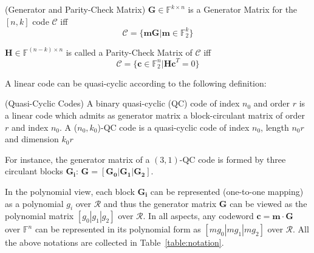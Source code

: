 \documentclass[runningheads]{llncs}
\begin{document}
\begin{definition}{(Generator and Parity-Check Matrix)}
$\mathbf{G}\in \mathbb{F}^{k\times n}$ is a Generator Matrix for the $[n,k]$ code $\mathcal{C}$ iff
\[
\mathcal{C}=\{\mathbf{mG}|\mathbf{m}\in \mathbb{F}_2^k\}
\]

$\mathbf{H}\in \mathbb{F}^{(n-k)\times n}$ is called a Parity-Check Matrix of $\mathcal{C}$ iff
\[
\mathcal{C}=\{\mathbf{c} \in \mathbb{F}_2^n |\mathbf{Hc}^T=0\}
\]
\end{definition}
%
A linear code can be quasi-cyclic according to the following definition:

\begin{definition}{(Quasi-Cyclic Codes)}
A binary quasi-cyclic (QC) code of index $n_0$ and order $r$ is a linear code which admits as generator matrix a block-circulant matrix of order $r$ and index $n_0$.
A ($n_0,k_0$)-QC code is a quasi-cyclic code of index $n_0$, length $n_0r$ and dimension $k_0r$
\end{definition}
%
For instance, the generator matrix of a $(3,1)$-QC code is formed by three circulant blocks $\mathbf{G_i}$:
$
\mathbf{G}=[\mathbf{G_0}|\mathbf{G_1}|\mathbf{G_2}]
$.

In the polynomial view, each block $\mathbf{G_i}$ can be represented (one-to-one mapping) as a polynomial $g_i$ over $\mathcal{R}$ and thus the generator matrix $\mathbf{G}$ can be viewed as the polynomial matrix $[g_0|g_1|g_2]$ over $\mathcal{R}$. In all aspects, any codeword $\mathbf{c}=\mathbf{m}\cdot\mathbf{G}$ over $\mathbb{F}^{n}$ can be represented in its polynomial form as $[mg_0|mg_1|mg_2]$ over $\mathcal{R}$. All the above notations are collected in
Table~\ref{table:notation}.
\end{document}

